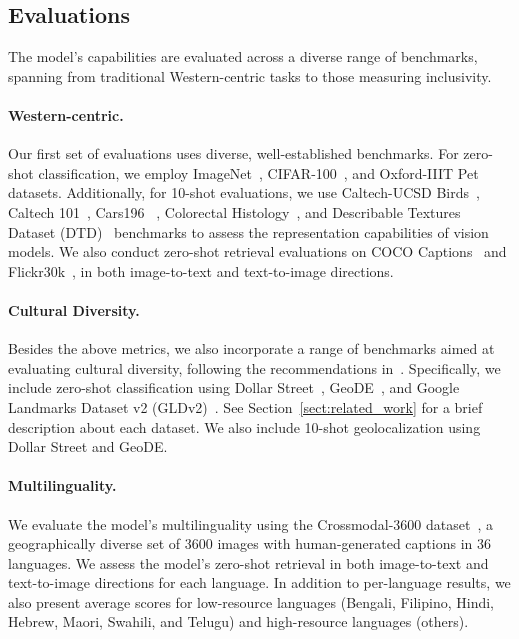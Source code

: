 \subsection{Evaluations}\label{sect:evals}
The model's capabilities are evaluated across a diverse range of benchmarks, spanning from traditional Western-centric tasks to those measuring inclusivity.

\paragraph{Western-centric.} Our first set of evaluations uses diverse, well-established benchmarks. For zero-shot classification, we employ ImageNet~\citep{deng2009imagenet}, CIFAR-100~\citep{krizhevsky2009learning}, and Oxford-IIIT Pet~\citep{pets} datasets. Additionally, for 10-shot evaluations, we use Caltech-UCSD Birds~\citep{wah2011caltech}, Caltech 101~\citep{li_andreeto_ranzato_perona_2022}, Cars196
~\citep{KrauseStarkDengFei-Fei_3DRR2013}, Colorectal Histology~\citep{kather2016multi}, and Describable Textures Dataset (DTD)~\citep{cimpoi14describing} benchmarks to assess the representation capabilities of vision models. We also conduct zero-shot retrieval evaluations on COCO Captions~\citep{chen2015microsoft} and Flickr30k~\citep{young2014image}, in both image-to-text and text-to-image directions.%

\paragraph{Cultural Diversity.}
Besides the above metrics, we also incorporate a range of benchmarks aimed at evaluating cultural diversity, following the recommendations in~\cite{pouget2024no}. Specifically, we include zero-shot classification using Dollar Street~\cite{rojas2022dollar}, GeoDE~\cite{ramaswamy2024geode}, and Google Landmarks Dataset v2 (GLDv2)~\cite{weyand2020google}. See Section~\ref{sect:related_work} for a brief description about each dataset. We also include 10-shot geolocalization using Dollar Street and GeoDE. 

\paragraph{Multilinguality.} We evaluate the model's multilinguality using the Crossmodal-3600 dataset~\citep{thapliyal2022crossmodal}, a geographically diverse set of 3600 images with human-generated captions in 36 languages. We assess the model's zero-shot retrieval in both image-to-text and text-to-image directions for each language. In addition to per-language results, we also present average scores for low-resource languages (Bengali, Filipino, Hindi, Hebrew, Maori, Swahili, and Telugu) and high-resource languages (others).

